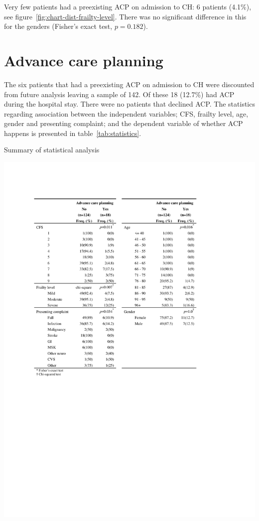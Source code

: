 \documentclass
[
	12pt,
	a4paper,
	oneside,
]{report}
\begin{document}
Very few patients had a preexisting ACP on admission to CH: 6
patients (4.1\%), see figure~\ref{fig:chart-dist-frailty-level}. There was no 
significant difference in this for the genders (Fisher's exact test, $p=0.182$).

\section{Advance care planning}

The six patients that had a preexisting ACP on admission to CH 
were discounted from future analysis leaving a sample of 142. Of these 18 
(12.7\%) had ACP during the hospital stay. There were no patients that 
declined ACP. The statistics regarding association between the independent 
variables; CFS, frailty level, age, gender and presenting complaint; and the 
dependent variable of whether ACP happens is presented in 
table~\ref{tab:statistics}.

\begin{table}[ht]
\centering
\caption{Summary of statistical analysis}
\label{tab:statistics}
\includegraphics[width=\textwidth,
	trim={2.5cm 10cm 2.5cm 2.5cm},
	clip]{media/statistical-analysis}
\end{table}
\end{document}
